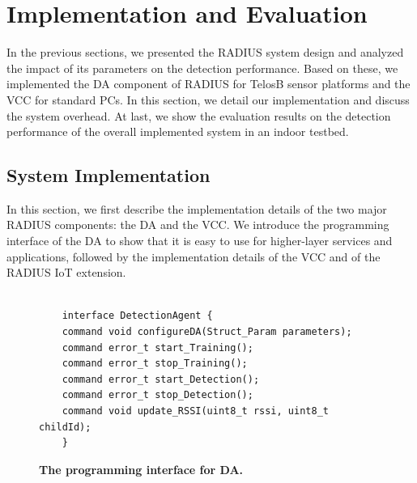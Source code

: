 \section{Implementation and Evaluation} \label{sec:imp&eva}

In the previous sections, we presented the RADIUS system design and analyzed the impact of its parameters on the detection performance. Based on these, we implemented the DA component of RADIUS for TelosB sensor platforms and the VCC for standard PCs. In this section, we detail our implementation and discuss the system overhead. At last, we show the evaluation results on the detection performance of the overall implemented system in an indoor testbed. 

\subsection{System Implementation} 

In this section, we first describe the implementation details of the two major RADIUS components: the DA and the VCC. We introduce the programming interface of the DA to show that it is easy to use for higher-layer services and applications, followed by the implementation details of the VCC and of the RADIUS IoT extension. 

\begin{figure}[h]
	\vspace{-0.3cm}
	\begin{lstlisting}[frame=single]  % Start your code-block
	
	interface DetectionAgent {
	command void configureDA(Struct_Param parameters);
	command error_t start_Training();
	command error_t stop_Training();
	command error_t start_Detection();
	command error_t stop_Detection();
	command void update_RSSI(uint8_t rssi, uint8_t childId);
	}
	\end{lstlisting}
	\vspace{-0.55cm}
	\caption{\textbf{The programming interface for DA.}}
	\label{fig:TinyOSinterface}
	\vspace{-0.3cm}
\end{figure}



